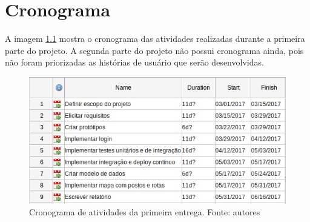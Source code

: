 \chapter[Cronograma]{Cronograma}
\label{chap:crono}

A imagem \ref{img:cronograma} mostra o cronograma das atividades realizadas durante a primeira parte do projeto. A segunda parte do projeto não possui cronograma ainda, pois não foram priorizadas as histórias de usuário que serão desenvolvidas.

\begin{figure}[H]
    \centering
    \includegraphics[scale=0.5]{figuras/cronograma_r1.png}
    \caption[Cronograma de atividades da primeira entrega.]{Cronograma de atividades da primeira entrega. Fonte: autores}
    \label{img:cronograma}
\end{figure}
